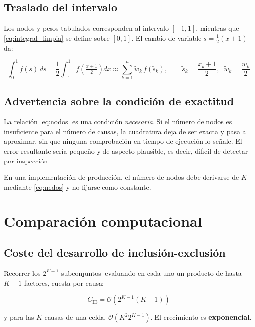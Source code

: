 \documentclass[a4paper, 12pt]{article}
\begin{document}
\subsection{Traslado del intervalo}

Los nodos y pesos tabulados corresponden al intervalo $[-1,1]$, mientras que \eqref{eq:integral_limpia} se define sobre $[0,1]$. El cambio de variable $s = \tfrac{1}{2}(x+1)$ da:

\begin{equation}
\int_0^1 f(s)\, ds = \frac{1}{2}\int_{-1}^{1} f\!\left(\tfrac{x+1}{2}\right) dx
\approx \sum_{k=1}^{n} \tilde{w}_k\, f(\tilde{s}_k),
\qquad
\tilde{s}_k = \frac{x_k+1}{2},\;\; \tilde{w}_k = \frac{w_k}{2}
\end{equation}

\subsection{Advertencia sobre la condición de exactitud}

La relación \eqref{eq:nodos} es una condición \emph{necesaria}. Si el número de nodos es insuficiente para el número de causas, la cuadratura deja de ser exacta y pasa a aproximar, sin que ninguna comprobación en tiempo de ejecución lo señale. El error resultante sería pequeño y de aspecto plausible, es decir, difícil de detectar por inspección.

En una implementación de producción, el número de nodos debe derivarse de $K$ mediante \eqref{eq:nodos} y no fijarse como constante.

\newpage

\section{Comparación computacional}

\subsection{Coste del desarrollo de inclusión-exclusión}

Recorrer los $2^{K-1}$ subconjuntos, evaluando en cada uno un producto de hasta $K-1$ factores, cuesta por causa:

\begin{equation}
C_{\text{IE}} = \mathcal{O}\!\left(2^{K-1}(K-1)\right)
\end{equation}

y para las $K$ causas de una celda, $\mathcal{O}(K^2 2^{K-1})$. El crecimiento es \textbf{exponencial}.
\end{document}
